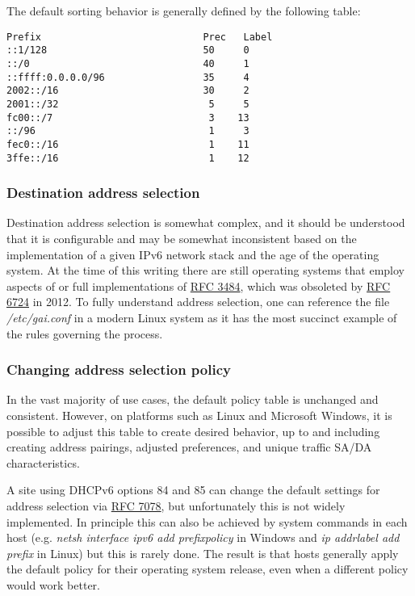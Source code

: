 \documentclass[
]{article}
\begin{document}
The default sorting behavior is generally defined by the following
table:

\begin{verbatim}
Prefix                            Prec   Label      
::1/128                           50     0    
::/0                              40     1  
::ffff:0.0.0.0/96                 35     4   
2002::/16                         30     2        
2001::/32                          5     5        
fc00::/7                           3    13   
::/96                              1     3       
fec0::/16                          1    11        
3ffe::/16                          1    12        
\end{verbatim}

\subsubsection{Destination address
selection}\label{destination-address-selection}

Destination address selection is somewhat complex, and it should be
understood that it is configurable and may be somewhat inconsistent
based on the implementation of a given IPv6 network stack and the age of
the operating system. At the time of this writing there are still
operating systems that employ aspects of or full implementations of
\href{https://www.rfc-editor.org/info/rfc3484}{RFC 3484}, which was
obsoleted by \href{https://www.rfc-editor.org/info/rfc6724}{RFC 6724} in
2012. To fully understand address selection, one can reference the file
\emph{/etc/gai.conf} in a modern Linux system as it has the most
succinct example of the rules governing the process.

\subsubsection{Changing address selection
policy}\label{changing-address-selection-policy}

In the vast majority of use cases, the default policy table is unchanged
and consistent. However, on platforms such as Linux and Microsoft
Windows, it is possible to adjust this table to create desired behavior,
up to and including creating address pairings, adjusted preferences, and
unique traffic SA/DA characteristics.

A site using DHCPv6 options 84 and 85 can change the default settings
for address selection via
\href{https://www.rfc-editor.org/info/rfc7078}{RFC 7078}, but
unfortunately this is not widely implemented. In principle this can also
be achieved by system commands in each host (e.g. \emph{netsh interface
ipv6 add prefixpolicy} in Windows and \emph{ip addrlabel add prefix} in
Linux) but this is rarely done. The result is that hosts generally apply
the default policy for their operating system release, even when a
different policy would work better.
\end{document}

